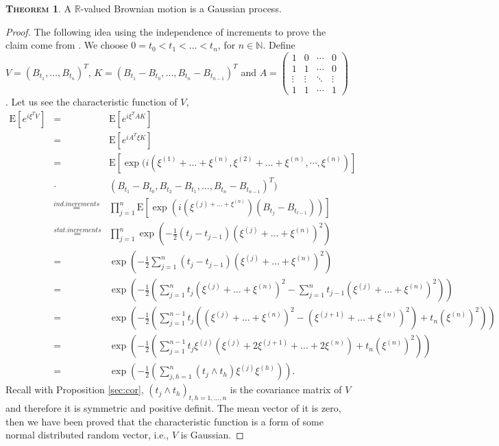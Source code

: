 \documentclass[a4paper, twoside, 11pt]{article}
\theoremstyle{definition}
\newtheorem{theorem}[definition]{\scshape Theorem}
\begin{document}
\begin{theorem}
  A $\mathbb{R}$-valued Brownian motion is a Gaussian process.
\end{theorem}
\begin{proof}
  The following idea using the independence of increments to prove the claim come from \cite{shilling}.
  We choose $0=t_0<t_1<\dots<t_n$, for $n \in \mathbb{N}$. Define
  $V = (B_{t_1},\dots,B_{t_n})^T$,  $K = (B_{t_1}-B_{t_0},\dots, B_{t_n}-B_{t_{n-1}})^T$ and 
  $A = 
  \begin{pmatrix}
	1      & 0      & \cdots & 0\\
	1      & 1      & \cdots & 0\\
	\vdots & \vdots & \ddots & \vdots \\
	1      & 1      & \cdots & 1
  \end{pmatrix}
	$.
  Let us see the characteristic function of $V$,
  \begin{eqnarray*}
	\mathrm{E} [e^{i\xi^T V}] &=& \mathrm{E} [e^{i\xi^T AK}]\\ 
	&=& \mathrm{E} [e^{iA^T\xi K}]\\
	&=& \mathrm{E} [\exp(i (\xi^{(1)}+\dots+\xi^{(n)}, \xi^{(2)}+\dots+\xi^{(n)}, \cdots,\xi^{(n)})] \\
	&\cdot& (B_{t_1}-B_{t_0}, B_{t_2}-B_{t_1},\dots,B_{t_n}-B_{t_{n-1}})^T)\\
	&\overset{ind.increments}{=}& \prod_{j=1}^n \mathrm{E} [\exp(i(\xi^{(j)+\dots+\xi^{(n)}})(B_{t_j}-B_{t_{t-1}}))]\\
	&\overset{stat.increments}{=}& \prod_{j=1}^n \exp(-\frac{1}{2}(t_j - t_{j-1})(\xi^{(j)}+\dots+\xi^{(n)})^2) \\
	&=& \exp\left(-\frac{1}{2}\sum_{j=1}^n (t_j - t_{j-1})(\xi^{(j)}+\dots+\xi^{(n)})^2\right)\\
    &=& \exp\left(-\frac{1}{2}\left(\sum_{j=1}^n t_j(\xi^{(j)}+\dots+\xi^{(n)})^2 - \sum_{j=1}^n t_{j-1}(\xi^{(j)}+\dots+\xi^{(n)})^2\right)\right)\\
	&=& \exp\left(-\frac{1}{2}\left(\sum_{j=1}^{n-1} t_j((\xi^{(j)}+\dots+\xi^{(n)})^2 - (\xi^{(j+1)}+\dots+\xi^{(n)})^2) + t_n(\xi^{(n)})^2\right)\right)\\
	&=& \exp\left(-\frac{1}{2}\left(\sum_{j=1}^{n-1} t_j\xi^{(j)}(\xi^{(j)}+2\xi^{(j+1)}+\dots+2\xi^{(n)}) + t_n(\xi^{(n)})^2\right)\right)\\
	&=& \exp\left(-\frac{1}{2}\left(\sum_{j,h=1}^n(t_j\wedge t_h)\xi^{(j)}\xi^{(h)}\right)\right).
  \end{eqnarray*}
  Recall with Proposition \ref{sec:cor}, $(t_j\wedge t_h)_{t,h=1,\dots,n}$ is the covariance matrix of $V$ and therefore it is symmetric and positive definit. The mean vector of it is zero, then we have been proved that the characteristic function is a form of some normal distributed random vector, i.e., $V$ is Gaussian.
\end{proof}
\end{document}
